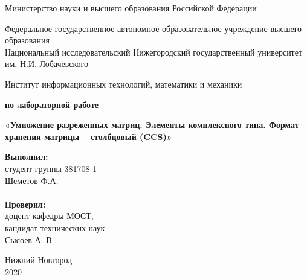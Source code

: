 \documentclass[14pt,a4paper,report]{ncc}
\begin{document}
	\begin{titlepage}
		
		\begin{center}
			Министерство науки и высшего образования Российской Федерации
		\end{center}
		
		\begin{center}
			Федеральное государственное автономное образовательное учреждение высшего образования \\
			Национальный исследовательский Нижегородский государственный университет им. Н.И. Лобачевского
		\end{center}
		
		\begin{center}
			Институт информационных технологий, математики и механики
		\end{center}
		
		\vspace{4em}
		
		\begin{center}
			\textbf{ по лабораторной работе} \\
		\end{center}
		\begin{center}
			\textbf{\Large«Умножение разреженных матриц. Элементы комплексного типа. Формат хранения матрицы – столбцовый (CCS)»} \\
		\end{center}
		
		\vspace{11em}
		\hfill\parbox{6.5cm}{
			\textbf{Выполнил:} \\ студент группы 381708-1 \\ Шеметов Ф.А.\\
			\\
			\textbf{Проверил:}\\ доцент кафедры МОСТ, \\ кандидат технических наук \\ Сысоев А. В.
		}
		
		\vspace{\fill}
		\begin{center} Нижний Новгород \\ 2020 \end{center}
		
	\end{titlepage}
	
	\setcounter{page}{2}
	
	\tableofcontents
	\newpage
	
\end{document}
